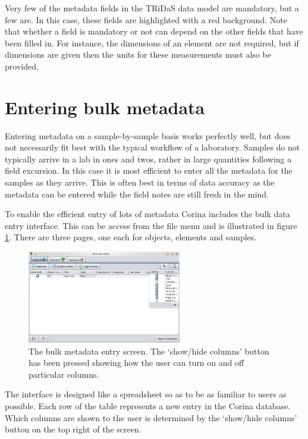 Very few of the metadata fields in the TRiDaS data model are mandatory, but a few are.  In this case, these fields are highlighted with a red background.  Note that whether a field is mandatory or not can depend on the other fields that have been filled in.  For instance, the dimensions of an element are not required, but if dimensions are given then the units for these measurements must also be provided.

\section{Entering bulk metadata}

Entering metadata on a sample-by-sample basis works perfectly well, but does not necessarily fit best with the typical workflow of a laboratory.  Samples do not typically arrive in a lab in ones and twos, rather in large quantities following a field excursion.  In this case it is most efficient to enter all the metadata for the samples as they arrive.  This is often best in terms of data accuracy as the metadata can be entered while the field notes are still fresh in the mind.

To enable the efficient entry of lots of metadata Corina includes the bulk data entry interface.  This can be access from the file menu and is illustrated in figure \ref{fig:bulkentry}.  There are three pages, one each for objects, elements and samples.

\begin{figure}
\centering
\includegraphics[width=0.6\textwidth]{Images/bulkentry.png}
\caption{The bulk metadata entry screen.  The `show/hide columns' button has been pressed showing how the user can turn on and off particular columns.} 
\label{fig:bulkentry}
\end{figure}

The interface is designed like a spreadsheet so as to be as familiar to users as possible.  Each row of the table represents a new entry in the Corina database.  Which columns are shown to the user is determined by the `show/hide columns' button on the top right of the screen.  


